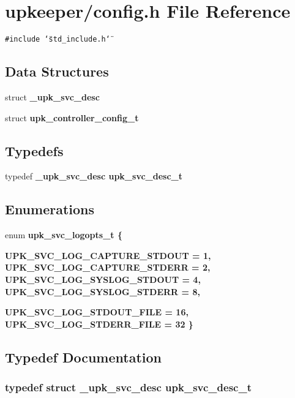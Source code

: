 \section{upkeeper/config.h File Reference}
\label{config_8h}
{\tt \#include \char`\"{}std\_\-include.h\char`\"{}}\par
\subsection*{Data Structures}
\begin{CompactItemize}
\item 
struct \bf{\_\-upk\_\-svc\_\-desc}
\item 
struct \bf{upk\_\-controller\_\-config\_\-t}
\end{CompactItemize}
\subsection*{Typedefs}
\begin{CompactItemize}
\item 
typedef \bf{\_\-upk\_\-svc\_\-desc} \bf{upk\_\-svc\_\-desc\_\-t}
\end{CompactItemize}
\subsection*{Enumerations}
\begin{CompactItemize}
\item 
enum \bf{upk\_\-svc\_\-logopts\_\-t} \{ \par
\bf{UPK\_\-SVC\_\-LOG\_\-CAPTURE\_\-STDOUT} =  1, 
\bf{UPK\_\-SVC\_\-LOG\_\-CAPTURE\_\-STDERR} =  2, 
\bf{UPK\_\-SVC\_\-LOG\_\-SYSLOG\_\-STDOUT} =  4, 
\bf{UPK\_\-SVC\_\-LOG\_\-SYSLOG\_\-STDERR} =  8, 
\par
\bf{UPK\_\-SVC\_\-LOG\_\-STDOUT\_\-FILE} =  16, 
\bf{UPK\_\-SVC\_\-LOG\_\-STDERR\_\-FILE} =  32
 \}
\end{CompactItemize}


\subsection{Typedef Documentation}
\subsubsection{\setlength{\rightskip}{0pt plus 5cm}typedef struct \bf{\_\-upk\_\-svc\_\-desc} \bf{upk\_\-svc\_\-desc\_\-t}}\label{config_8h_db063e76b698ce0ca834754647dd95ce}




